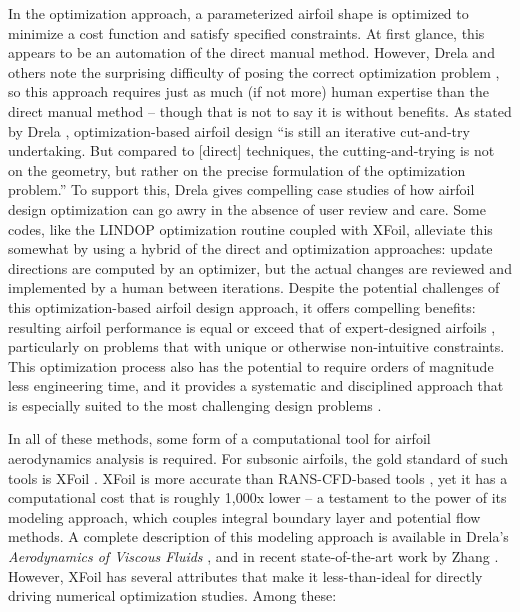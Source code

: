 \documentclass[conf]{new-aiaa}
\begin{document}
    In the optimization approach, a parameterized airfoil shape is optimized to minimize a cost function and satisfy specified constraints. At first glance, this appears to be an automation of the direct manual method. However, Drela and others note the surprising difficulty of posing the correct optimization problem \cite{drela_pros_1998, kroo_multidisciplinary_1997}, so this approach requires just as much (if not more) human expertise than the direct manual method -- though that is not to say it is without benefits. As stated by Drela \cite{drela_pros_1998}, optimization-based airfoil design ``is still an iterative cut-and-try undertaking. But compared to [direct] techniques, the cutting-and-trying is not on the geometry, but rather on the precise formulation of the optimization problem.'' To support this, Drela gives compelling case studies of how airfoil design optimization can go awry in the absence of user review and care. Some codes, like the LINDOP \cite{mses} optimization routine coupled with XFoil, alleviate this somewhat by using a hybrid of the direct and optimization approaches: update directions are computed by an optimizer, but the actual changes are reviewed and implemented by a human between iterations. Despite the potential challenges of this optimization-based airfoil design approach, it offers compelling benefits: resulting airfoil performance is equal or exceed that of expert-designed airfoils \cite{drela_pros_1998}, particularly on problems that with unique or otherwise non-intuitive constraints. This optimization process also has the potential to require orders of magnitude less engineering time, and it provides a systematic and disciplined approach that is especially suited to the most challenging design problems \cite{he2019robust}.

    In all of these methods, some form of a computational tool for airfoil aerodynamics analysis is required. For subsonic airfoils, the gold standard of such tools is XFoil \cite{drela_xfoil_1989}. XFoil is more accurate than RANS-CFD-based tools \cite{morgado2016xfoil}, yet it has a computational cost that is roughly 1,000x lower -- a testament to the power of its modeling approach, which couples integral boundary layer and potential flow methods. A complete description of this modeling approach is available in Drela's \textit{Aerodynamics of Viscous Fluids} \cite{drela_aerodynamics_2019}, and in recent state-of-the-art work by Zhang \cite{zhang_threedimensional_2022, zhang_nonparametric_2017}. However, XFoil has several attributes that make it less-than-ideal for directly driving numerical optimization studies. Among these:
\end{document}

